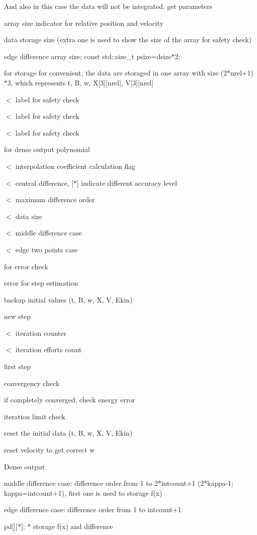 And also in this case the data will not be integrated. get parameters

array size indicator for relative position and velocity

data storage size (extra one is used to show the size of the array for safety check)

edge difference array size; const std\+::size\+\_\+t psize=dsize$\ast$2;

for storage for convenient, the data are storaged in one array with size (2$\ast$nrel+1)$\ast$3, which represents t, B, w, X\mbox{[}3\mbox{]}\mbox{[}nrel\mbox{]}, V\mbox{[}3\mbox{]}\mbox{[}nrel\mbox{]}

$<$ label for safety check

$<$ label for safety check

$<$ label for safety check

for dense output polynomial

$<$ interpolation coefficient calculation flag

$<$ central difference, \mbox{[}$\ast$\mbox{]} indicate different accuracy level

$<$ maximum difference order

$<$ data size

$<$ middle difference case

$<$ edge two points case

for error check

error for step estimation

backup initial values (t, B, w, X, V, Ekin)

new step

$<$ iteration counter

$<$ iteration efforts count

first step

convergency check

if completely converged, check energy error

iteration limit check

reset the initial data (t, B, w, X, V, Ekin)

reset velocity to get correct w

Dense output

middle difference case\+: difference order from 1 to 2$\ast$intcount+1 (2$\ast$kappa-\/1; kappa=intcount+1), first one is used to storage f(x)

edge difference case\+: difference order from 1 to intcount+1

pd\mbox{[}\mbox{]}\mbox{[}$\ast$\mbox{]}\+: $\ast$ storage f(x) and difference

